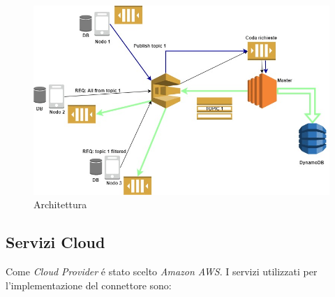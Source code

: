 \documentclass{article}
\begin{document}
\begin{figure}[h]
\begin{center}
\centering
\includegraphics[width=1.25\textwidth]{architettura.jpg} %
\caption{Architettura}
\label{fig:Architettura}
\end{center}
\end{figure}

\subsection{Servizi Cloud}

Come \textit{Cloud Provider} \'e stato scelto \textit{Amazon AWS}. I servizi utilizzati per l'implementazione del connettore sono:
\end{document}

